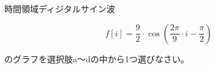 時間領域ディジタルサイン波 

\[
f[i] = \frac{9}{2} \cdot \cos \left ( \frac{2 \pi}{9} \cdot i  - \frac{\pi}{2} \right )
\]

\noindent のグラフを選択肢a〜dの中から1つ選びなさい。
